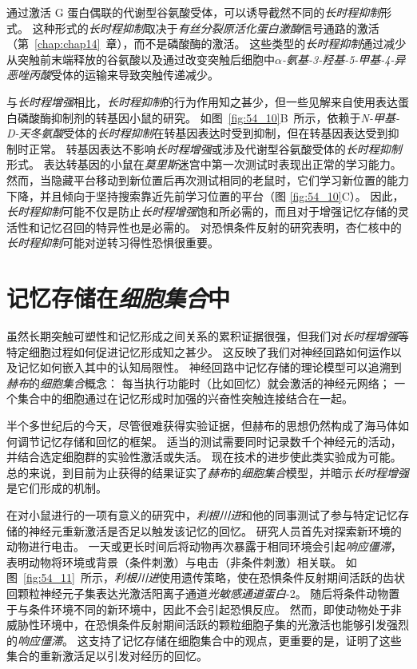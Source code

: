通过激活 G 蛋白偶联的代谢型谷氨酸受体，可以诱导截然不同的\textit{长时程抑制}形式。
这种形式的\textit{长时程抑制}取决于\textit{\textit{有丝分裂原活化蛋白激酶}}信号通路的激活（第~\ref{chap:chap14}~章），而不是磷酸酶的激活。
这些类型的\textit{长时程抑制}通过减少从突触前末端释放的谷氨酸以及通过改变突触后细胞中\textit{$\alpha$-氨基-3-羟基-5-甲基-4-异恶唑丙酸}受体的运输来导致突触传递减少。


与\textit{长时程增强}相比，\textit{长时程抑制}的行为作用知之甚少，但一些见解来自使用表达蛋白磷酸酶抑制剂的转基因小鼠的研究。
如图~\ref{fig:54_10}B~所示，依赖于\textit{N-甲基-D-天冬氨酸}受体的\textit{长时程抑制}在转基因表达时受到抑制，但在转基因表达受到抑制时正常。
转基因表达不影响\textit{长时程增强}或涉及代谢型谷氨酸受体的\textit{长时程抑制}形式。
表达转基因的小鼠在\textit{莫里斯}迷宫中第一次测试时表现出正常的学习能力。
然而，当隐藏平台移动到新位置后再次测试相同的老鼠时，它们学习新位置的能力下降，并且倾向于坚持搜索靠近先前学习位置的平台（图 \ref{fig:54_10}C）。
因此，\textit{长时程抑制}可能不仅是防止\textit{长时程增强}饱和所必需的，而且对于增强记忆存储的灵活性和记忆召回的特异性也是必需的。
对恐惧条件反射的研究表明，杏仁核中的\textit{长时程抑制}可能对逆转习得性恐惧很重要。



\section{记忆存储在\textit{细胞集合}中}

虽然长期突触可塑性和记忆形成之间关系的累积证据很强，但我们对\textit{长时程增强}等特定细胞过程如何促进记忆形成知之甚少。
这反映了我们对神经回路如何运作以及记忆如何嵌入其中的认知局限性。
神经回路中记忆存储的理论模型可以追溯到\textit{赫布}的\textit{细胞集合}概念：
每当执行功能时（比如回忆）就会激活的神经元网络；
一个集合中的细胞通过在记忆形成时加强的兴奋性突触连接结合在一起。


半个多世纪后的今天，尽管很难获得实验证据，但赫布的思想仍然构成了海马体如何调节记忆存储和回忆的框架。
适当的测试需要同时记录数千个神经元的活动，并结合选定细胞群的实验性激活或失活。
现在技术的进步使此类实验成为可能。
总的来说，到目前为止获得的结果证实了\textit{赫布}的\textit{细胞集合}模型，并暗示\textit{长时程增强}是它们形成的机制。


在对小鼠进行的一项有意义的研究中，\textit{利根川进}和他的同事测试了参与特定记忆存储的神经元重新激活是否足以触发该记忆的回忆。
研究人员首先对探索新环境的动物进行电击。
一天或更长时间后将动物再次暴露于相同环境会引起\textit{响应僵滞}，表明动物将环境或背景（条件刺激）与电击（非条件刺激）相关联。
如图~\ref{fig:54_11}~所示，\textit{利根川进}使用遗传策略，使在恐惧条件反射期间活跃的齿状回颗粒神经元子集表达光激活阳离子通道\textit{光敏感通道蛋白}-2。
随后将条件动物置于与条件环境不同的新环境中，因此不会引起恐惧反应。
然而，即使动物处于非威胁性环境中，在恐惧条件反射期间活跃的颗粒细胞子集的光激活也能够引发强烈的\textit{响应僵滞}。
这支持了记忆存储在细胞集合中的观点，更重要的是，证明了这些集合的重新激活足以引发对经历的回忆。


